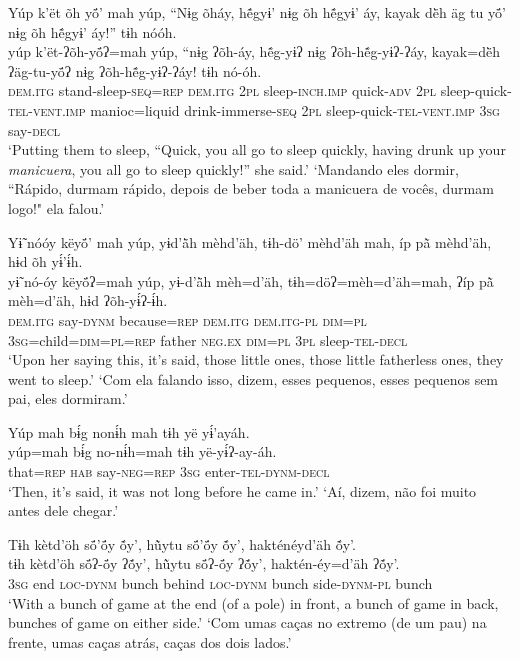 \documentclass[output=paper,
modfonts,nonflat
]{langsci/langscibook}
\begin{document}
\ea  Yúp k’ët õh yö́’ mah yúp, “Nɨg õháy, hẽ́gyɨ’ nɨg õh hẽ́gyɨ’ áy, kayak dë̀h äg tu yö́’ nɨg õh hẽ́gyɨ’ áy!” tɨh nóóh.\\ 
\gll yúp k’ët-ʔõh-yö́ʔ=mah yúp, “nɨg ʔõh-áy, hẽ́g-yɨʔ nɨg ʔõh-hẽ́g-yɨʔ-ʔáy, kayak=dë̀h ʔäg-tu-yö́ʔ nɨg ʔõh-hẽ́g-yɨʔ-ʔáy! tɨh nó-óh.\\
     \textsc{dem.itg} stand-sleep-\textsc{seq=rep} \textsc{dem.itg} \textsc{2pl} sleep-\textsc{inch.imp} quick\textsc{-adv} \textsc{2pl} sleep-quick\textsc{-tel-vent.imp} manioc=liquid drink-immerse\textsc{-seq} \textsc{2pl} sleep-quick\textsc{-tel-vent.imp} \textsc{3sg} say\textsc{-decl}\\
\glt ‘Putting them to sleep, “Quick, you all go to sleep quickly, having drunk up your \textit{manicuera},{\footnotemark} you all go to sleep quickly!” she said.'
\glt ‘Mandando eles dormir, “Rápido, durmam rápido, depois de beber toda a manicuera de vocês, durmam logo!" ela falou.'
\z

\ea  Yɨ̃ nóóy këyö́’ mah yúp, yɨd’ä̀h mèhd’äh, tɨh-dö’ mèhd’äh mah, íp pã̀ mèhd’äh, hɨd õh yɨ́’ɨ́h.\\ 
\gll yɨ̃ nó-óy këyö́ʔ=mah yúp, yɨ-d’ä̀h mèh=d’äh, tɨh=döʔ=mèh=d’äh=mah, ʔíp pã̀ mèh=d’äh, hɨd ʔõh-yɨ́ʔ-ɨ́h.\\
     \textsc{dem.itg} say\textsc{-dynm} because\textsc{=rep} \textsc{dem.itg} \textsc{dem.itg-pl} \textsc{dim=pl} \textsc{3sg}=child\textsc{=dim=pl=rep} father \textsc{neg.ex} \textsc{dim=pl} \textsc{3pl} sleep\textsc{-tel-decl}\\
\glt ‘Upon her saying this, it’s said, those little ones, those little fatherless ones, they went to sleep.'
\glt ‘Com ela falando isso, dizem, esses pequenos, esses pequenos sem pai, eles dormiram.'
\z 

\ea  Yúp mah bɨ́g nonɨ́h mah tɨh yë yɨ́’ayáh.\\ 
\gll yúp=mah bɨ́g no-nɨ́h=mah tɨh yë-yɨ́ʔ-ay-áh.\\
     that\textsc{=rep} \textsc{hab} say\textsc{-neg=rep} \textsc{3sg} enter\textsc{-tel-dynm-decl}\\
\glt ‘Then, it’s said, it was not long before he came in.' 
\glt ‘Aí, dizem, não foi muito antes dele chegar.'
\z 

\newpage
\ea  Tɨh kètd’öh sö́’ö́y ṍy’, hũ̀ytu sö́’ö́y ṍy’, hakténéyd’äh ṍy’.\\ 
\gll tɨh kètd’öh sö́ʔ-ö́y ʔṍy’, hũ̀ytu sö́ʔ-ö́y ʔṍy’, haktén-éy=d’äh ʔṍy’.\\
     \textsc{3sg} end \textsc{loc-dynm} bunch behind \textsc{loc-dynm} bunch side\textsc{-dynm-pl} bunch\\
\glt ‘With a bunch of game at the end (of a pole) in front, a bunch of game in back, bunches of game on either side.'
\glt ‘Com umas caças no extremo (de um pau) na frente, umas caças atrás, caças dos dois lados.'
\z 
\end{document}
